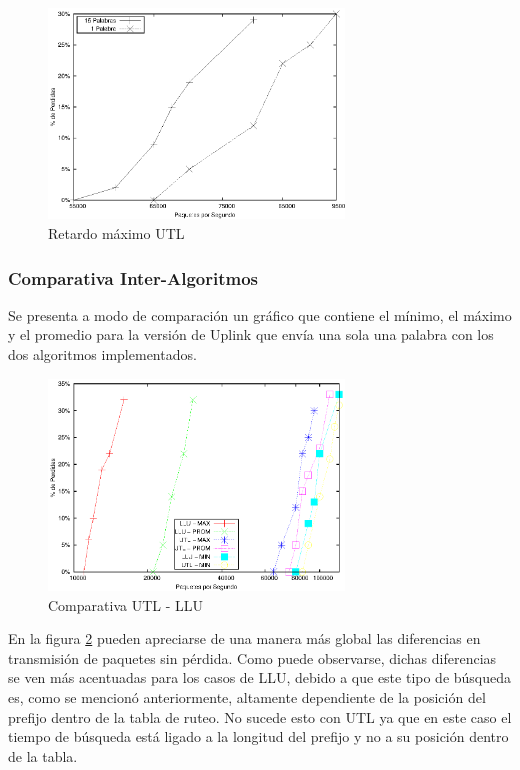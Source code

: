 \begin{figure}[!h]
  \centering
	\includegraphics[width=0.7\textwidth]{5-resultados/graf/utlmax.eps}
  \caption{Retardo máximo UTL}
  \label{fig}
\end{figure}

\newpage
\subsubsection{Comparativa Inter-Algoritmos}
Se presenta a modo de comparación un gráfico que contiene el mínimo, el máximo y el promedio para la versión de Uplink que envía una sola una palabra con los dos algoritmos implementados. 
\begin{figure}[!h]
  \centering
	\includegraphics[width=0.7\textwidth]{5-resultados/graf/lluvsutl.eps}
  \caption{Comparativa UTL - LLU}
  \label{figvs}
\end{figure}

En la figura \ref{figvs} pueden apreciarse de una manera más global las diferencias en transmisión de paquetes sin pérdida. Como puede observarse, dichas diferencias se ven más acentuadas para los casos de LLU, debido a que este tipo de búsqueda es, como se mencionó anteriormente, altamente dependiente de la posición del prefijo dentro de la tabla de ruteo. No sucede esto con UTL ya que en este caso el tiempo de búsqueda está ligado a la longitud del prefijo y no a su posición dentro de la tabla.


